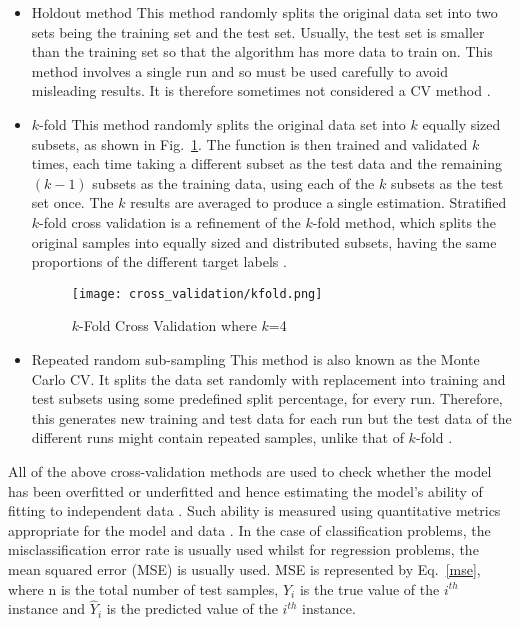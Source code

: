 \begin{itemize}
\item Holdout method \newline {}
This method randomly splits the original data set into two sets being the training set and the test set. Usually, the test set is smaller than the training set so that the algorithm has more data to train on. This method involves a single run and so must be used carefully to avoid misleading results. It is therefore sometimes not considered a CV method \citep{kohavi1995study}.

\item $k$-fold\newline {}
This method randomly splits the original data set into $k$ equally sized subsets, as shown in Fig.~\ref{fig:kfold}. The function is then trained and validated $k$ times, each time taking a different subset as the test data and the remaining $(k-1)$ subsets as the training data, using each of the $k$ subsets as the test set once. The $k$ results are averaged to produce a single estimation. Stratified $k$-fold cross validation is a refinement of the $k$-fold method, which splits the original samples into equally sized and distributed subsets, having the same proportions of the different target labels \citep{kohavi1995study}.

\begin{figure}
  \centering
  \texttt{[image: cross\_validation/kfold.png]}
  \caption{$k$-Fold Cross Validation where $k$=4}
  \label{fig:kfold}
\end{figure}

\item Repeated random sub-sampling\newline {}
This method is also known as the Monte Carlo CV. It splits the data set randomly with replacement into training and test subsets using some predefined split percentage, for every run. Therefore, this generates new training and test data for each run but the test data of the different runs might contain repeated samples, unlike that of $k$-fold \citep{xu2001monte}.
\end{itemize}

All of the above cross-validation methods are used to check whether the model has been overfitted or underfitted and hence estimating the model's ability of fitting to independent data . Such ability is measured using quantitative metrics appropriate for the model and data \citep{kohavi1995study, arlot2010survey}. In the case of classification problems, the misclassification error rate is usually used whilst for regression problems, the mean squared error (MSE) is usually used. MSE is represented by Eq.~\ref{mse}, where n is the total number of test samples, $Y_i$ is the true value of the $i^{th}$ instance and $\hat{Y}_i$ is the predicted value of the $i^{th}$ instance.

